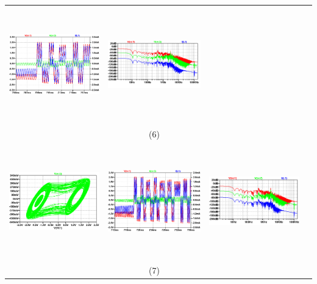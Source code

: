 \documentclass{rbf}
\begin{document}
\begin{table}[h]
\begin{tabular}{c c c c}
        \includegraphics[width=5cm,height=5cm]{R7/1419.44 C220 800m time series.png}&
        \includegraphics[width=5cm,height=5cm]{R7/1419.44 C220 800m fft.png}&\\
        & (6) &  \\
        \includegraphics[width=5cm,height=5cm]{R7/1419.61 C220 800m atractor.png}&
        \includegraphics[width=5cm,height=5cm]{R7/1419.61 C220 800m time series.png}&
        \includegraphics[width=5cm,height=5cm]{R7/1419.61 C220 800m fft.png}&\\
     & (7) &  \\
     \hline  
    \end{tabular}
\end{table}
\end{document}
